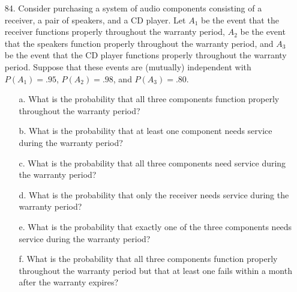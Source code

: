 \documentclass[letterpaper,12pt]{article}
\begin{document}
\begin{enumerate}
\begin{center}
    \end{center}
  \item[84.]
    Consider purchasing a system of audio components consisting of a receiver, a pair of speakers, and a CD player. Let $A_1$ be the event that the receiver functions properly throughout the warranty period, $A_2$ be the event that the speakers function properly throughout the warranty period, and $A_3$ be the event that the CD player functions properly throughout the warranty period. Suppose that these events are (mutually) independent with $P(A_1) = .95$, $P(A_2) = .98$, and $P(A_3) = .80$.
    \begin{enumerate}
      \item[a.]
        What is the probability that all three components function properly throughout the warranty period?
      \item[b.]
        What is the probability that at least one component needs service during the warranty period?
      \item[c.]
        What is the probability that all three components need service during the warranty period?
      \item[d.]
        What is the probability that only the receiver needs service during the warranty period?
      \item[e.]
        What is the probability that exactly one of the three components needs service during the warranty period?
      \item[f.]
        What is the probability that all three components function properly throughout the warranty period but that at least one fails within a month after the warranty expires?
    \end{enumerate}
\end{enumerate}
\end{document}
